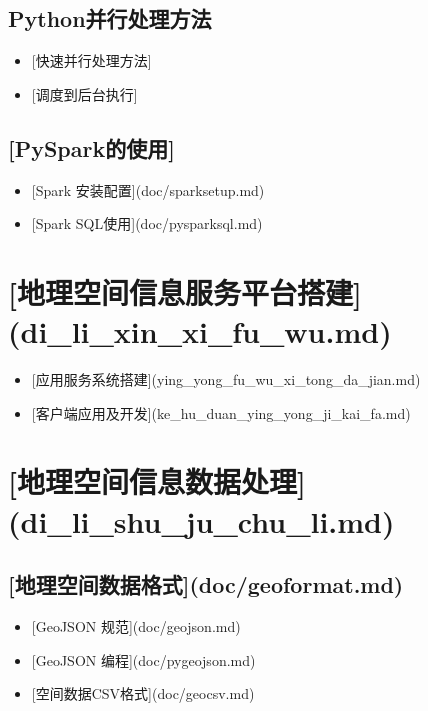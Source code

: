 \documentclass[letterpaper,10pt,english]{sphinxmanual}
\begin{document}
\section{Python并行处理方法}
\label{index:python}\begin{itemize}
\item {} 
{[}快速并行处理方法{]}

\item {} 
{[}调度到后台执行{]}

\end{itemize}


\section{{[}PySpark的使用{]}}
\label{index:pyspark}\begin{itemize}
\item {} 
{[}Spark 安装配置{]}(doc/sparksetup.md)

\item {} 
{[}Spark SQL使用{]}(doc/pysparksql.md)

\end{itemize}


\chapter{{[}地理空间信息服务平台搭建{]}(di\_li\_xin\_xi\_fu\_wu.md)}
\label{index:di-li-xin-xi-fu-wu-md}\begin{itemize}
\item {} 
{[}应用服务系统搭建{]}(ying\_yong\_fu\_wu\_xi\_tong\_da\_jian.md)

\item {} 
{[}客户端应用及开发{]}(ke\_hu\_duan\_ying\_yong\_ji\_kai\_fa.md)

\end{itemize}


\chapter{{[}地理空间信息数据处理{]}(di\_li\_shu\_ju\_chu\_li.md)}
\label{index:di-li-shu-ju-chu-li-md}

\section{{[}地理空间数据格式{]}(doc/geoformat.md)}
\label{index:doc-geoformat-md}\begin{itemize}
\item {} 
{[}GeoJSON 规范{]}(doc/geojson.md)

\item {} 
{[}GeoJSON 编程{]}(doc/pygeojson.md)

\item {} 
{[}空间数据CSV格式{]}(doc/geocsv.md)

\end{itemize}
\end{document}
